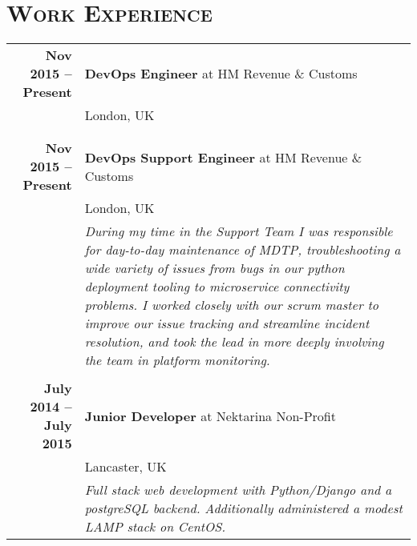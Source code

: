 \documentclass[a4paper,10pt]{article} %
\begin{document}
\section{\textsc{Work Experience}}
\centering
\begin{tabularx}{\textwidth}{r|X}
\textbf{Nov 2015 -- Present}       & \textbf{DevOps Engineer} at HM Revenue \& Customs \\
                                   & London, UK \\
                                   & \footnotesize\emph{} \\

\multicolumn{2}{r}{} \\ %

\textbf{Nov 2015 -- Present}       & \textbf{DevOps Support Engineer} at HM Revenue \& Customs \\
                                   & London, UK \\
                                   & \footnotesize\emph{During my time in the
                                   Support Team I was responsible for
                                   day-to-day maintenance of MDTP,
                                   troubleshooting a wide variety of issues
                                   from bugs in our python deployment tooling
                                   to microservice connectivity problems. I
                                   worked closely with our scrum master to
                                   improve our issue tracking and streamline
                                   incident resolution, and took the lead in
                                   more deeply involving the team in platform
                                   monitoring.}\\

\multicolumn{2}{r}{} \\ %

\textbf{July 2014 -- July 2015}    & \textbf{Junior Developer} at {Nektarina Non-Profit}\\
                                   & Lancaster, UK\\
                                   & \footnotesize\emph{Full stack web development with Python/Django and a postgreSQL backend. Additionally administered a modest LAMP stack on CentOS.}\\

\end{tabularx}
\end{document}
